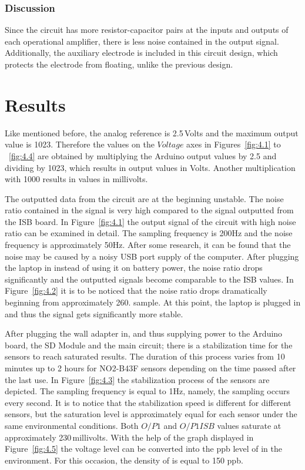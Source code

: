 \subsection{Discussion}
Since the circuit has more resistor-capacitor pairs at the inputs and outputs of each operational amplifier, there is less noise contained in the output signal. Additionally, the auxiliary electrode is included in this circuit design, which protects the electrode from floating, unlike the previous design.

\chapter{Results}
Like mentioned before, the analog reference is 2.5\,Volts and the maximum output value is 1023. Therefore the values on the $Voltage$ axes in Figures~\ref{fig:4.1} to ~\ref{fig:4.4} are obtained by multiplying the Arduino output values by 2.5 and dividing by 1023, which results in output values in Volts. Another multiplication with 1000 results in values in millivolts. \par    
The outputted data from the circuit are at the beginning unstable. The noise ratio contained in the signal is very high compared to the signal outputted from the ISB board. In Figure~\ref{fig:4.1} the output signal of the circuit with high noise ratio can be examined in detail. The sampling frequency is 200Hz and the noise frequency is approximately 50Hz. After some research, it can be found that the noise may be caused by a noisy USB port supply of the computer. After plugging the laptop in instead of using it on battery power, the noise ratio drops significantly and the outputted signals become comparable to the ISB values. In Figure~\ref{fig:4.2} it is to be noticed that the noise ratio drops dramatically beginning from approximately 260. sample. At this point, the laptop is plugged in and thus the signal gets significantly more stable. \par 
After plugging the wall adapter in, and thus supplying power to the Arduino board, the SD Module and the main circuit; there is a stabilization time for the sensors to reach saturated results. The duration of this process varies from 10 minutes up to 2 hours for NO2-B43F sensors depending on the time passed after the last use.\cite{FAQs} In Figure~\ref{fig:4.3} the stabilization process of the sensors are depicted. The sampling frequency is equal to 1Hz, namely, the sampling occurs every second. It is to notice that the stabilization speed is different for different sensors, but the saturation level is approximately equal for each sensor under the same environmental conditions. Both $O/P1$ and $O/P1 ISB$ values saturate at approximately 230\,millivolts. With the help of the graph displayed in Figure~\ref{fig:4.5} the voltage level can be converted into the ppb level of  in the environment. For this occasion, the density of  is equal to 150 ppb. \par 
